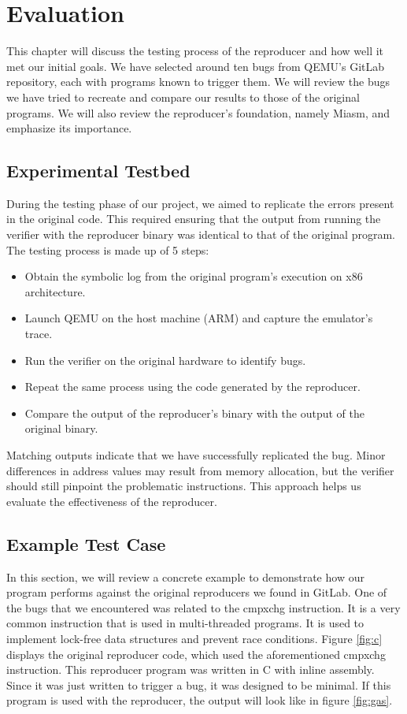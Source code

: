 
\chapter{Evaluation}\label{chapter:evaluation}
This chapter will discuss the testing process of the reproducer and how well it met our initial goals.
We have selected around ten bugs from \ac{QEMU}'s GitLab repository, each with programs known to trigger them.
We will review the bugs we have tried to recreate and compare our results to those of the original programs. 
We will also review the reproducer's foundation, namely Miasm, and emphasize its importance.

\section{Experimental Testbed}
During the testing phase of our project, we aimed to replicate the errors present in the original code.
This required ensuring that the output from running the verifier with the reproducer binary was identical to that of the original program.
The testing process is made up of 5 steps:
\begin{itemize}
    \item Obtain the symbolic log from the original program's execution on x86 architecture.
    \item Launch \ac{QEMU} on the host machine (ARM) and capture the emulator's trace.
    \item Run the verifier on the original hardware to identify bugs.
    \item Repeat the same process using the code generated by the reproducer.
    \item Compare the output of the reproducer's binary with the output of the original binary.
\end{itemize}

Matching outputs indicate that we have successfully replicated the bug.
Minor differences in address values may result from memory allocation, but the verifier should still pinpoint the problematic instructions.
This approach helps us evaluate the effectiveness of the reproducer.

\section{Example Test Case}
In this section, we will review a concrete example to demonstrate how our program performs against the original reproducers we found in GitLab.
One of the bugs that we encountered was related to the cmpxchg instruction.
It is a very common instruction that is used in multi-threaded programs.
It is used to implement lock-free data structures and prevent race conditions.
Figure \ref{fig:c} displays the original reproducer code, which used the aforementioned cmpxchg instruction.
This reproducer program was written in C with inline assembly.
Since it was just written to trigger a bug, it was designed to be minimal.
If this program is used with the reproducer, the output will look like in figure \ref{fig:gas}.

